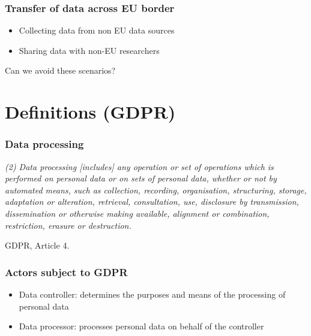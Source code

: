 \documentclass[17pt,aspectratio=169,hyperref={pdfusetitle,colorlinks,allcolors=olive}]{beamer}
\begin{document}
\begin{frame}[fragile]
  \frametitle{Transfer of data across EU border}

  \begin{itemize}
  \item Collecting data from non EU data sources
  \item Sharing data with non-EU researchers
  \end{itemize}

  \begin{flushright}
    Can we avoid these scenarios?
  \end{flushright}
\end{frame}

\section{Definitions (GDPR)}

\begin{frame}[fragile]
  \frametitle{Data processing}

  {\small
    {\em
    (2) Data processing [includes] any operation or set of operations which is performed  on  personal  data  or  on  sets  of  personal  data,  whether  or  not  by  automated  means,  such  as collection,  recording,  organisation,  structuring,  storage,  adaptation  or  alteration,  retrieval,  consultation, use,  disclosure  by  transmission,  dissemination  or  otherwise  making  available,  alignment  or  combination, restriction, erasure or destruction.
    }
  \begin{flushright}
    GDPR, Article 4.
  \end{flushright}
  }
  
\end{frame}

\begin{frame}[fragile]
  \frametitle{Actors subject to GDPR}

  \begin{itemize}
  \item Data controller: determines the purposes and means of the processing of personal data
  \item Data processor: processes personal data on behalf of the controller
  \end{itemize}
    
\end{frame}
\end{document}
